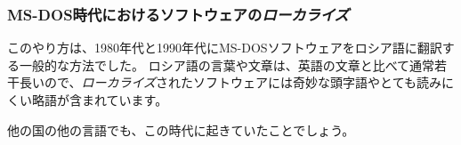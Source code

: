 \subsubsection{MS-DOS時代におけるソフトウェアの\emph{ローカライズ}}

このやり方は、1980年代と1990年代にMS-DOSソフトウェアをロシア語に翻訳する一般的な方法でした。 ロシア語の言葉や文章は、英語の文章と比べて通常若干長いので、\emph{ローカライズ}されたソフトウェアには奇妙な頭字語やとても読みにくい略語が含まれています。

他の国の他の言語でも、この時代に起きていたことでしょう。
